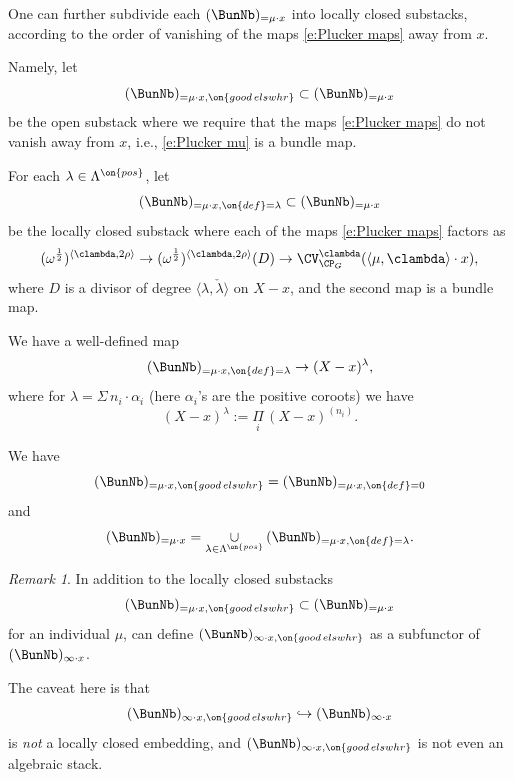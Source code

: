 \documentclass[9pt]{amsart}
\theoremstyle{definition}
\theoremstyle{remark}
\newtheorem{rem}[subsubsection]{Remark}
\numberwithin{equation}{section}
\begin{document}
\sssec{}

One can further subdivide each $(\BunNb)_{=\mu\cdot x}$ into locally closed substacks, according to the order of vanishing of 
the maps \eqref{e:Plucker maps} away from $x$.

\medskip

Namely, let
$$(\BunNb)_{=\mu\cdot x,\on{good\,elswhr}}\subset (\BunNb)_{=\mu\cdot x}$$
be the open substack where we require that the maps \eqref{e:Plucker maps} do not vanish away from $x$, i.e., 
\eqref{e:Plucker mu} is a bundle map. 

\medskip

For each $\lambda\in \Lambda^{\on{pos}}$, let 
$$(\BunNb)_{=\mu\cdot x,\on{def}=\lambda}\subset (\BunNb)_{=\mu\cdot x}$$
be the locally closed substack where each of the maps \eqref{e:Plucker maps} factors as
$$(\omega^{\frac{1}{2}})^{\langle \clambda,2\rho\rangle}\to 
(\omega^{\frac{1}{2}})^{\langle \clambda,2\rho\rangle}(D)\to \CV^{\clambda}_{\CP_G}(\langle \mu,\clambda \rangle\cdot x),$$
where $D$ is a divisor of degree $\langle \lambda,\check\lambda\rangle$ on $X-x$, and the second map is a bundle map. 

\medskip

We have a well-defined map
$$(\BunNb)_{=\mu\cdot x,\on{def}=\lambda}\to (X-x)^\lambda,$$
where for $\lambda=\Sigma\, n_i\cdot \alpha_i$ (here $\alpha_i$'s are the positive coroots) we have
$$(X-x)^\lambda:=\underset{i}\Pi\, (X-x)^{(n_i)}.$$

\medskip

We have
$$(\BunNb)_{=\mu\cdot x,\on{good\,elswhr}}=(\BunNb)_{=\mu\cdot x,\on{def}=0}$$ and
$$(\BunNb)_{=\mu\cdot x}=\underset{\lambda\in \Lambda^{\on{pos}}}\cup\, (\BunNb)_{=\mu\cdot x,\on{def}=\lambda}.$$

\begin{rem} \label{r:not a substack}
In addition to the locally closed substacks
$$(\BunNb)_{=\mu\cdot x,\on{good\,elswhr}}\subset (\BunNb)_{=\mu\cdot x}$$
for an individual $\mu$, 
can define $(\BunNb)_{\infty\cdot x,\on{good\,elswhr}}$ as a subfunctor of 
$(\BunNb)_{\infty\cdot x}$. 

\medskip

The caveat here is that  
$$(\BunNb)_{\infty\cdot x,\on{good\,elswhr}}\hookrightarrow (\BunNb)_{\infty\cdot x}$$
is \emph{not} a locally closed embedding, and $(\BunNb)_{\infty\cdot x,\on{good\,elswhr}}$ is not
even an algebraic stack. 
\end{rem}

\sssec{}
\end{document}
